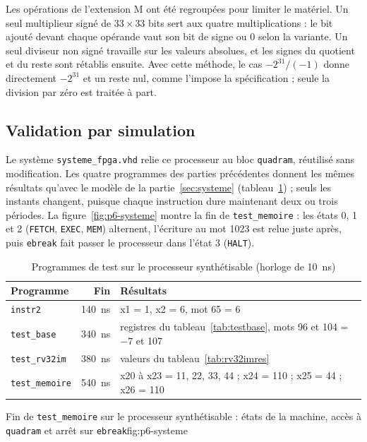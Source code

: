 Les opérations de l'extension M ont été regroupées pour limiter le matériel. Un seul
multiplieur signé de $33\times33$ bits sert aux quatre multiplications : le bit ajouté
devant chaque opérande vaut son bit de signe ou 0 selon la variante. Un seul diviseur non
signé travaille sur les valeurs absolues, et les signes du quotient et du reste sont
rétablis ensuite. Avec cette méthode, le cas $-2^{31}/(-1)$ donne directement $-2^{31}$ et un
reste nul, comme l'impose la spécification ; seule la division par zéro est traitée à part.

\subsection{Validation par simulation}

Le système \texttt{systeme\_fpga.vhd} relie ce processeur au bloc \texttt{quadram}, réutilisé
sans modification. Les quatre programmes des parties précédentes donnent les mêmes résultats
qu'avec le modèle de la partie~\ref{sec:systeme} (tableau~\ref{tab:fpga-sim}) ; seuls les
instants changent, puisque chaque instruction dure maintenant deux ou trois périodes. La
figure~\ref{fig:p6-systeme} montre la fin de \texttt{test\_memoire} : les états 0, 1 et 2
(\texttt{FETCH}, \texttt{EXEC}, \texttt{MEM}) alternent, l'écriture au mot 1023 est
relue juste après, puis \texttt{ebreak} fait passer le processeur dans l'état 3
(\texttt{HALT}).

\begin{table}[H]
\centering
\begin{tabular}{lrl}
\toprule
Programme & Fin & Résultats \\
\midrule
\texttt{instr2} & 140~ns & x1 = 1, x2 = 6, mot 65 = 6 \\
\texttt{test\_base} & 340~ns & registres du tableau~\ref{tab:testbase}, mots 96 et 104 = $-7$ et 107 \\
\texttt{test\_rv32im} & 380~ns & valeurs du tableau~\ref{tab:rv32imres} \\
\texttt{test\_memoire} & 540~ns & x20 à x23 = 11, 22, 33, 44 ; x24 = 110 ; x25 = 44 ; x26 = 110 \\
\bottomrule
\end{tabular}
\caption{Programmes de test sur le processeur synthétisable (horloge de 10~ns)}
\label{tab:fpga-sim}
\end{table}

{Fin de \texttt{test\_memoire} sur le processeur synthétisable : états de la machine,
accès à \texttt{quadram} et arrêt sur \texttt{ebreak}}{fig:p6-systeme}

